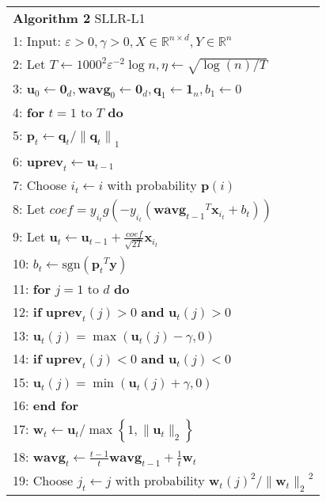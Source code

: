 \documentclass{llncs}
\newcommand{\bw}{\mathbf{w}}
\newcommand{\bwavg}{\mathbf{wavg}}
\newcommand{\bu}{\mathbf{u}}
\newcommand{\buprev}{\mathbf{uprev}}
\newcommand{\bp}{\mathbf{p}}
\newcommand{\bq}{\mathbf{q}}
\newcommand{\lc}{\left(}
\newcommand{\rc}{\right)}
\newcommand{\lj}{\lc j\rc}
\newcommand{\tspace}{\hspace*{2em}}
\newcommand{\tspaces}{\hspace*{1.5em}}
\def\sgn{\mathrm{sgn}}
\begin{document}
	\begin{table}[ht]
	\begin{tabular}{l}
	\hline\noalign{\smallskip}
	\textbf{Algorithm 2} SLLR-L1 \\
	\noalign{\smallskip}
	\hline
	\noalign{\smallskip}
		1:    Input: $\varepsilon>0, \gamma>0, X\in\mathbb{R}^{n\times d}, Y\in\mathbb{R}^{n}$ \\
		2:    Let $T\leftarrow{1000}^{2}{\varepsilon}^{-2}\log n, \eta\leftarrow\sqrt{\log\lc n\rc/T}$ \\
		3:    \tspace ${\mathbf{u}}_{0}\leftarrow{\mathbf{0}}_{d},{\bwavg}_{0}\leftarrow{\mathbf{0}}_{d},{\mathbf{\bq}}_{1}\leftarrow{\mathbf{1}}_{n},{b}_{1}\leftarrow 0$\\
		4:    \textbf{for} $t=1$ to $T$ \textbf{do} \\
		5:    \tspace ${\bp}_{t}\leftarrow{\bq}_{t}/{\|{\bq}_{t}\|}_{1}$ \\
		6:	  \tspace $\buprev_t\leftarrow\bu_{t-1}$ \\
		7:    \tspace Choose ${i}_{t}\leftarrow i$ with probability $\bp(i)$ \\
		8:    \tspace Let $coef={y}_{{i}_{t}}g\lc-{y}_{{i}_{t}}\lc {{\bwavg}_{t-1}}^{T}{\mathbf{x}}_{i_t}+{b}_{t} \rc\rc$ \\
		9:    \tspace Let ${\bu}_{t}\leftarrow {\bu}_{t-1}+\frac{coef}{\sqrt{2T}}{\mathbf{x}}_{{i}_{t}}$ \\
		10:   \tspaces\tspace ${b}_{t}\leftarrow \sgn\lc {{\bp}_{t}}^{T}\mathbf{y}\rc$ \\
		11:   \tspaces \textbf{for} $j=1$ to $d$ \textbf{do} \\
		12:   \tspaces\tspace \textbf{if} $\buprev_t\lj>0$ \textbf{and} $\bu_t\lj>0$ \\
		13:	  \tspaces\tspace\tspace $\bu_t\lj=\max \lc \bu_t\lj-\gamma ,0 \rc$ \\
		14:	  \tspaces\tspace \textbf{if} $\buprev_t\lj<0$ \textbf{and} $\bu_t\lj<0$ \\
		15:   \tspaces\tspace\tspace $\bu_t\lj=\min \lc \bu_t\lj+\gamma ,0 \rc$ \\
		16:   \tspaces \textbf{end for} \\
		17:   \tspaces ${\bw}_{t}\leftarrow {\bu}_{t}/\max \left\{1,\|{\bu}_{t}\|_2 \right\}$ \\
		18:   \tspaces ${\bwavg}_{t}\leftarrow \frac{t-1}{t}{\bwavg}_{t-1}+\frac{1}{t}\bw_t$ \\
		19:   \tspaces Choose ${j}_{t}\leftarrow j$ with probability ${{\bw}_{t}\lj}^{2}/{\|{\bw}_{t}\|_2}^{2} $ \\

\end{tabular}
\end{table}
\end{document}
